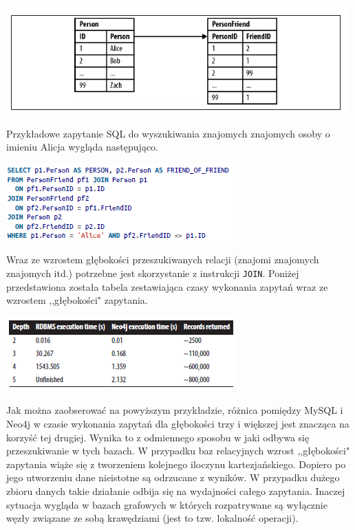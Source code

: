 \documentclass[brudnopis]{xmgr}
\begin{document}
\includegraphics[scale=0.75]{images/relational-schema-friends.png}

Przykładowe zapytanie SQL do wyszukiwania znajomych znajomych osoby o imieniu Alicja wygląda następująco.

\includegraphics[scale=0.75]{images/relational-schema-friends-fof-query.png}

Wraz ze wzrostem głębokości przeszukiwanych relacji (znajomi znajomych znajomych itd.) potrzebne jest skorzystanie z instrukcji \texttt{JOIN}. Poniżej przedstawiona została tabela zestawiająca czasy wykonania zapytań wraz ze wzrostem ,,głębokości" zapytania.

\includegraphics[scale=0.75]{images/relational-schema-friends-results.png}

Jak można zaobserować na powyższym przykładzie, różnica pomiędzy MySQL i Neo4j w czasie wykonania zapytań dla głębokości trzy i większej jest znacząca na korzyść tej drugiej. Wynika to z odmiennego sposobu w jaki odbywa się przeszukiwanie w tych bazach. W przypadku baz relacyjnych wzrost ,,głębokości" zapytania wiąże się z tworzeniem kolejnego iloczynu kartezjańskiego. Dopiero po jego utworzeniu dane nieistotne są odrzucane z wyników. W przypadku dużego zbioru danych takie działanie odbija się na wydajności całego zapytania. Inaczej sytuacja wygląda w bazach grafowych w których rozpatrywane są wyłącznie węzły związane ze sobą krawędziami (jest to tzw. lokalność operacji).
\end{document}
